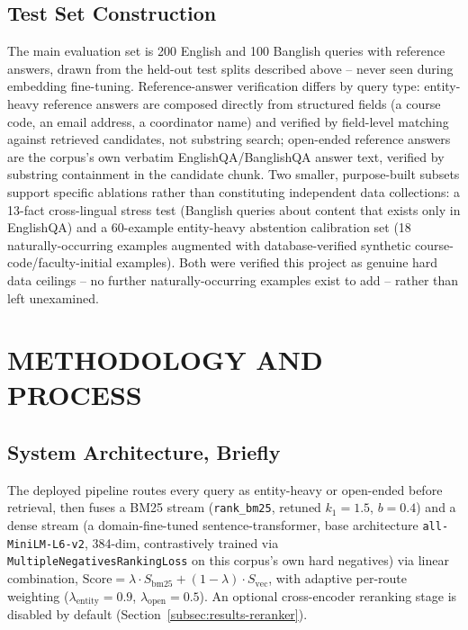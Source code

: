 \documentclass[a4paper,twoside]{article}
\begin{document}
\subsection{Test Set Construction}
\label{subsec:testset-construction}

The main evaluation set is 200 English and 100 Banglish queries with reference answers, drawn from the held-out test splits described above -- never seen during embedding fine-tuning. Reference-answer verification differs by query type: entity-heavy reference answers are composed directly from structured fields (a course code, an email address, a coordinator name) and verified by field-level matching against retrieved candidates, not substring search; open-ended reference answers are the corpus's own verbatim EnglishQA/BanglishQA answer text, verified by substring containment in the candidate chunk. Two smaller, purpose-built subsets support specific ablations rather than constituting independent data collections: a 13-fact cross-lingual stress test (Banglish queries about content that exists only in EnglishQA) and a 60-example entity-heavy abstention calibration set (18 naturally-occurring examples augmented with database-verified synthetic course-code/faculty-initial examples). Both were verified this project as genuine hard data ceilings -- no further naturally-occurring examples exist to add -- rather than left unexamined.

\section{\uppercase{Methodology and Process}}
\label{sec:methodology}

\subsection{System Architecture, Briefly}
\label{subsec:architecture-brief}

The deployed pipeline routes every query as entity-heavy or open-ended before retrieval, then fuses a BM25 stream (\texttt{rank\_bm25}, retuned $k_1=1.5$, $b=0.4$) and a dense stream (a domain-fine-tuned sentence-transformer, base architecture \texttt{all-MiniLM-L6-v2}, 384-dim, contrastively trained via \texttt{MultipleNegativesRankingLoss} on this corpus's own hard negatives) via linear combination, $\mathrm{Score} = \lambda \cdot S_{\mathrm{bm25}} + (1-\lambda) \cdot S_{\mathrm{vec}}$, with adaptive per-route weighting ($\lambda_{\mathrm{entity}}=0.9$, $\lambda_{\mathrm{open}}=0.5$). An optional cross-encoder reranking stage is disabled by default (Section~\ref{subsec:results-reranker}).
\end{document}

